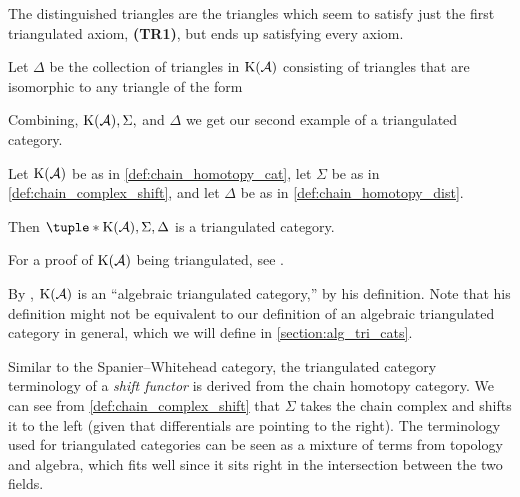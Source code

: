 The distinguished triangles are the triangles which seem to satisfy just the first triangulated axiom, {\bf (TR1)}, but ends up satisfying every axiom.

\begin{definition}
    \label{def:chain_homotopy_dist}
    Let \( \Delta \) be the collection of triangles in \( \operatorname{K}({\mathcal{A}}) \) consisting of triangles that are isomorphic to any triangle of the form

    \begin{center}
    \end{center}
\end{definition}

Combining, \( \operatorname{K}({\mathcal{A}}), \Sigma, \) and \( \Delta \) we get our second example of a triangulated category.

\begin{example}
    Let \( \operatorname{K}({\mathcal{A}}) \) be as in \autoref{def:chain_homotopy_cat}, let \( \Sigma \) be as in \autoref{def:chain_complex_shift}, and let \( \Delta \) be as in \autoref{def:chain_homotopy_dist}.

    Then \( \tuple*{\K(\Ac), \Sigma, \Delta} \) is a triangulated category.
\end{example}
For a proof of \( \operatorname{K}({\mathcal{A}}) \) being triangulated, see \cite[Proposition 3.5.25]{Zimmermann_2014}.

By \cite[Section 7.5]{Krause_2007}, \( \operatorname{K}({\mathcal{A}}) \) is an ``algebraic triangulated category,'' by his definition. Note that his definition might not be equivalent to our definition of an algebraic triangulated category in general, which we will define in \autoref{section:alg_tri_cats}.

Similar to the Spanier--Whitehead category, the triangulated category terminology of a \emph{shift functor} is derived from the chain homotopy category. We can see from \autoref{def:chain_complex_shift} that \( \Sigma \) takes the chain complex and shifts it to the left (given that differentials are pointing to the right). The terminology used for triangulated categories can be seen as a mixture of terms from topology and algebra, which fits well since it sits right in the intersection between the two fields.